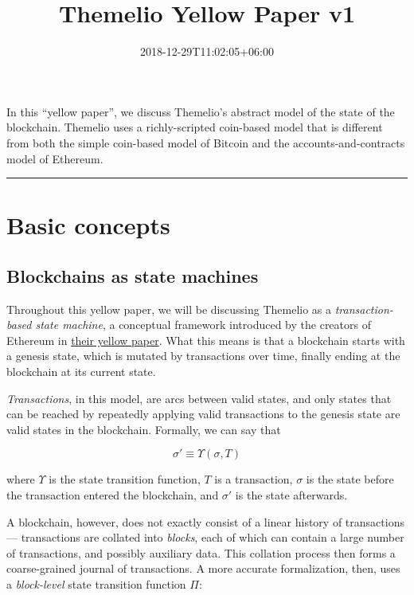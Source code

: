 \documentclass[
]{article}
\title{Themelio Yellow Paper v1}
\author{}
\date{2018-12-29T11:02:05+06:00}
\begin{document}
\maketitle

In this ``yellow paper'', we discuss Themelio's abstract model of the
state of the blockchain. Themelio uses a richly-scripted coin-based
model that is different from both the simple coin-based model of Bitcoin
and the accounts-and-contracts model of Ethereum.

\begin{center}\rule{0.5\linewidth}{0.5pt}\end{center}

\hypertarget{basic-concepts}{%
  \section{Basic concepts}\label{basic-concepts}}

\hypertarget{blockchains-as-state-machines}{%
  \subsection{Blockchains as state
    machines}\label{blockchains-as-state-machines}}

Throughout this yellow paper, we will be discussing Themelio as a
\emph{transaction-based state machine}, a conceptual framework
introduced by the creators of Ethereum in
\href{https://ethereum.github.io/yellowpaper/paper.pdf}{their yellow
  paper}. What this means is that a blockchain starts with a genesis
state, which is mutated by transactions over time, finally ending at the
blockchain at its current state.

\emph{Transactions}, in this model, are arcs between valid states, and
only states that can be reached by repeatedly applying valid
transactions to the genesis state are valid states in the blockchain.
Formally, we can say that

\[\sigma' \equiv \Upsilon(\sigma, T)\]

where \(\Upsilon\) is the state transition function, \(T\) is a
transaction, \(\sigma\) is the state before the transaction entered the
blockchain, and \(\sigma'\) is the state afterwards.

A blockchain, however, does not exactly consist of a linear history of
transactions --- transactions are collated into \emph{blocks}, each of
which can contain a large number of transactions, and possibly auxiliary
data. This collation process then forms a coarse-grained journal of
transactions. A more accurate formalization, then, uses a
\emph{block-level} state transition function \(\Pi\):
\end{document}

